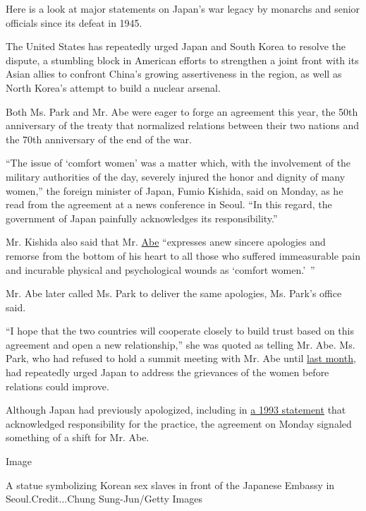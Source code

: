 Here is a look at major statements on Japan's war legacy by monarchs and
senior officials since its defeat in 1945.

The United States has repeatedly urged Japan and South Korea to resolve
the dispute, a stumbling block in American efforts to strengthen a joint
front with its Asian allies to confront China's growing assertiveness in
the region, as well as North Korea's attempt to build a nuclear arsenal.

Both Ms. Park and Mr. Abe were eager to forge an agreement this year,
the 50th anniversary of the treaty that normalized relations between
their two nations and the 70th anniversary of the end of the war.

``The issue of `comfort women' was a matter which, with the involvement
of the military authorities of the day, severely injured the honor and
dignity of many women,'' the foreign minister of Japan, Fumio Kishida,
said on Monday, as he read from the agreement at a news conference in
Seoul. ``In this regard, the government of Japan painfully acknowledges
its responsibility.''

Mr. Kishida also said that Mr.
\href{http://topics.nytimes.com/top/reference/timestopics/people/a/shinzo_abe/index.html?inline=nyt-per}{Abe}
``expresses anew sincere apologies and remorse from the bottom of his
heart to all those who suffered immeasurable pain and incurable physical
and psychological wounds as `comfort women.'~''

Mr. Abe later called Ms. Park to deliver the same apologies, Ms. Park's
office said.

``I hope that the two countries will cooperate closely to build trust
based on this agreement and open a new relationship,'' she was quoted as
telling Mr. Abe. Ms. Park, who had refused to hold a summit meeting with
Mr. Abe until
\href{http://www.nytimes.com/2015/11/02/world/asia/japan-south-korea-summit-park-geun-hye-shinzo-abe.html}{last
month}, had repeatedly urged Japan to address the grievances of the
women before relations could improve.

Although Japan had previously apologized, including in
\href{http://www.nytimes.com/1993/08/05/world/japan-admits-army-forced-women-into-war-brothels.html}{a
1993 statement} that acknowledged responsibility for the practice, the
agreement on Monday signaled something of a shift for Mr. Abe.

Image

A statue symbolizing Korean sex slaves in front of the Japanese Embassy
in Seoul.Credit...Chung Sung-Jun/Getty Images

